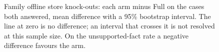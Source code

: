 \begin{figure}[!t]
\caption{Family offline store knock-outs: each arm minus Full on the cases both answered, mean difference with a 95\% bootstrap interval. The line at zero is no difference; an interval that crosses it is not resolved at this sample size. On the unsupported-fact rate a negative difference favours the arm.}
\label{fig:forest_shravani_off}
\end{figure}